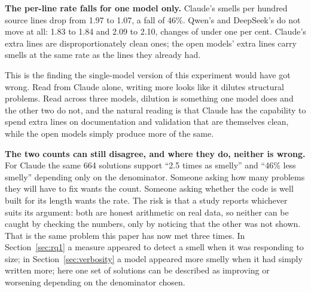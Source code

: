 \documentclass[10pt,a4paper,twocolumn]{article}
\begin{document}
\textbf{The per-line rate falls for one model only.} Claude's smells per hundred
source lines drop from 1.97 to 1.07, a fall of 46\%. Qwen's and DeepSeek's do
not move at all: 1.83 to 1.84 and 2.09 to 2.10, changes of under one per cent.
Claude's extra lines are disproportionately clean ones; the open models' extra
lines carry smells at the same rate as the lines they already had.

This is the finding the single-model version of this experiment would have got
wrong. Read from Claude alone, writing more looks like it dilutes structural
problems. Read across three models, dilution is something one model does and the
other two do not, and the natural reading is that Claude has the capability to
spend extra lines on documentation and validation that are themselves clean, while
the open models simply produce more of the same.

\textbf{The two counts can still disagree, and where they do, neither is wrong.}
For Claude the same 664 solutions support ``2.5 times as smelly'' and ``46\%
less smelly'' depending only on the denominator. Someone asking how many
problems they will have to fix wants the count. Someone asking whether the code
is well built for its length wants the rate. The risk is that a study reports
whichever suits its argument: both are honest arithmetic on real data, so
neither can be caught by checking the numbers, only by noticing that the other
was not shown. That is the same problem this paper has now met three times. In
Section~\ref{sec:rq1} a measure appeared to detect a smell when it was
responding to size; in Section~\ref{sec:verbosity} a model appeared more smelly
when it had simply written more; here one set of solutions can be described as
improving or worsening depending on the denominator chosen.
\end{document}
